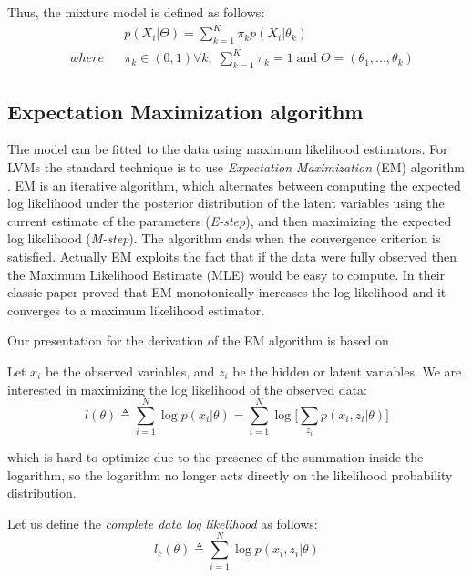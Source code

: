 Thus, the mixture model is defined as follows:
\begin{equation}
	\begin{aligned}
		& 
		& & p(X_{i}|\Theta) = \sum_{k=1}^{K}\pi_{k}p(X_{i}|\theta_{k}) \\
		& where 
		& & \pi_{k} \in (0, 1) \forall k, \; \sum_{k=1}^{K}\pi_{k} = 1  \; \text{and} \; \Theta = (\theta_{1},...,\theta_{k})
	\end{aligned}
\end{equation}

\subsection{Expectation Maximization algorithm}
The model can be fitted to the data using maximum likelihood estimators. For LVMs the standard technique is to use \emph{Expectation Maximization} (EM) algorithm \citep{Dempster1977}. EM is an iterative algorithm, which alternates between computing the expected log likelihood under the posterior distribution of the latent variables using the current estimate of the parameters (\emph{E-step}), and then maximizing the expected log likelihood (\emph{M-step}). The algorithm ends when the convergence criterion is satisfied. Actually EM exploits the fact that if the data were fully observed then the Maximum Likelihood Estimate (MLE) would be easy to compute. In their classic paper \cite{Dempster1977} proved that EM monotonically increases the log likelihood and it converges to a maximum likelihood estimator. 

Our presentation for the derivation of the EM algorithm is based on \cite[Ch. \ 11]{Murphy2012}

Let $x_{i}$ be the observed variables, and $z_{i}$ be the hidden or latent variables. We are interested in maximizing the log likelihood of the observed data:
\begin{equation} \label{log-lik-observed-f}
	l(\theta) \triangleq \sum_{i=1}^{N} \log p(x_{i}|\theta) =  \sum_{i=1}^{N} \log \bigg[\sum_{z_{i}} p(x_{i}, z_{i}|\theta) \bigg]
\end{equation}

which is hard to optimize due to the presence of the summation inside the logarithm, so the logarithm no longer acts directly on the likelihood probability distribution.

Let us define the \emph{complete data log likelihood} as follows:
\begin{equation} \label{log-lik-observed-f}
	l_{c}(\theta) \triangleq \sum_{i=1}^{N} \log p(x_{i}, z_{i}|\theta)
\end{equation}

